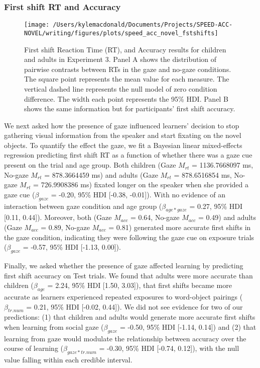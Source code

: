 \documentclass[oneside]{report}
\begin{document}
\subsubsection{First shift RT and
Accuracy}\label{first-shift-rt-and-accuracy}
\begin{figure}[!t]

{\centering \texttt{[image: /Users/kylemacdonald/Documents/Projects/SPEED-ACC-NOVEL/writing/figures/plots/speed\_acc\_novel\_fstshifts]} 

}

\caption[First shift Reaction Time and Accuracy results for Experiment 5.3.]{First shift Reaction Time (RT), and Accuracy results for children and adults in Experiment 3. Panel A shows the distribution of pairwise contrasts between RTs in the gaze and no-gaze conditions. The square point represents the mean value for each measure. The vertical dashed line represents the null model of zero condition difference. The width each point represents the 95\% HDI. Panel B shows the same information but for participants' first shift accuracy.}\label{fig:speed-acc-novel-shifts}
\end{figure}
We next asked how the presence of gaze influenced learners' decision to
stop gathering visual information from the speaker and start fixating on
the novel objects. To quantify the effect the gaze, we fit a Bayesian
linear mixed-effects regression predicting first shift RT as a function
of whether there was a gaze cue present on the trial and age group. Both
children (Gaze \(M_{rt}\) = 1136.7668097 ms, No-gaze \(M_{rt}\) =
878.3664459 ms) and adults (Gaze \(M_{rt}\) = 878.6516854 ms, No-gaze
\(M_{rt}\) = 726.9908386 ms) fixated longer on the speaker when she
provided a gaze cue (\(\beta_{gaze}\) = -0.20, 95\% HDI {[}-0.38,
-0.01{]}). With no evidence of an interaction between gaze condition and
age group (\(\beta_{age*gaze}\) = 0.27, 95\% HDI {[}0.11, 0.44{]}).
Moreover, both (Gaze \(M_{acc}\) = 0.64, No-gaze \(M_{acc}\) = 0.49) and
adults (Gaze \(M_{acc}\) = 0.89, No-gaze \(M_{acc}\) = 0.81) generated
more accurate first shifts in the gaze condition, indicating they were
following the gaze cue on exposure trials (\(\beta_{gaze}\) = -0.57,
95\% HDI {[}-1.13, 0.00{]}).

Finally, we asked whether the presence of gaze affected learning by
predicting first shift accuracy on Test trials. We found that adults
were more accurate than children (\(\beta_{age}\) = 2.24, 95\% HDI
{[}1.50, 3.03{]}), that first shifts became more accurate as learners
experienced repeated exposures to word-object pairings
(\(\beta_{tr.num}\) = 0.21, 95\% HDI {[}-0.02, 0.44{]}). We did not see
evidence for two of our predictions: (1) that children and adults would
generate more accurate first shifts when learning from social gaze
(\(\beta_{gaze}\) = -0.50, 95\% HDI {[}-1.14, 0.14{]}) and (2) that
learning from gaze would modulate the relationship between accuracy over
the course of learning (\(\beta_{gaze*tr.num}\) = -0.30, 95\% HDI
{[}-0.74, 0.12{]}), with the null value falling within each credible
interval.
\end{document}
